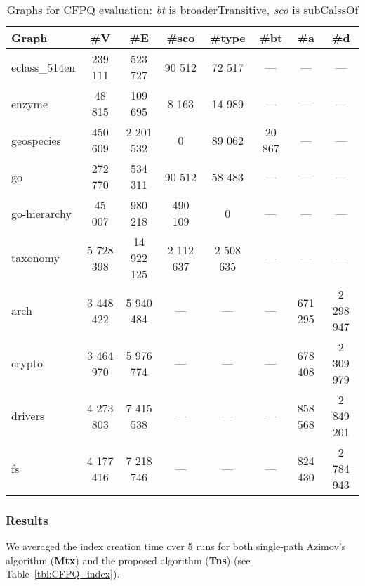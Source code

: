 {\setlength{\tabcolsep}{0.3em}
\begin{table}
    \centering   
{
\caption{Graphs for CFPQ evaluation: \textit{bt} is broaderTransitive, \textit{sco} is subCalssOf}
\label{tbl:graphs_for_cfpq}
\scriptsize
{}
\begin{tabular}{|l|c|c|c|c|c|c|c|}
\hline
Graph          & \#V       & \#E        & \#sco & \#type &\#bt & \#a  & \#d \\
\hline
\hline
eclass\_514en  & 239 111    & 523 727    & 90 512    & 72 517    &        ---        & ---  & --- \\
enzyme         & 48 815     & 109 695    & 8 163     & 14 989    &        ---        & ---  & --- \\
geospecies     & 450 609    & 2 201 532  & 0         & 89 062    &        20 867     & ---  & --- \\
go             & 272 770    & 534 311    & 90 512    & 58 483    &        ---        & ---  & --- \\
go-hierarchy   & 45 007     & 980 218    & 490 109   & 0         &        ---        & ---  & --- \\
taxonomy       & 5 728 398  & 14 922 125 & 2 112 637 & 2 508 635 &        ---        & ---  & --- \\
\hline
arch           & 3 448 422  & 5 940 484  &      ---     &  ---   &        ---        & 671 295 & 2 298 947 \\
crypto         & 3 464 970  & 5 976 774  &      ---     &  ---   &        ---        & 678 408 & 2 309 979 \\
drivers        & 4 273 803  & 7 415 538  &      ---     &  ---   &        ---        & 858 568 & 2 849 201 \\
fs             & 4 177 416  & 7 218 746  &      ---     &  ---   &        ---        & 824 430 & 2 784 943 \\
\hline
\end{tabular}
}
\end{table}
}
\subsubsection{Results}

We averaged the index creation time over 5 runs for both single-path Azimov's algorithm (\textbf{Mtx}) and the proposed algorithm (\textbf{Tns}) (see Table~\ref{tbl:CFPQ_index}).


